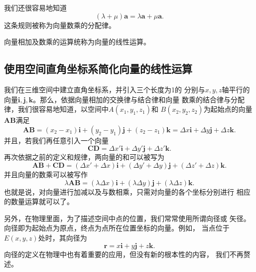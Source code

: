 我们还很容易地知道
\begin{equation}
    (\lambda+\mu)\boldsymbol{a}=\lambda\boldsymbol{a}+
    \mu\boldsymbol{a}.
\end{equation}
这条规则被称为向量数乘的分配律。

向量相加及数乘的运算统称为向量的线性运算。
\subsection{使用空间直角坐标系简化向量的线性运算}
我们在三维空间中建立直角坐标系，并引入三个长度为1的
分别与$x,y,z$轴平行的向量$\boldsymbol{i},\boldsymbol{j},
\boldsymbol{k}$。那么，依据向量相加的交换律与结合律和向量
数乘的结合律与分配律，我们很容易地知道，以空间中$A(x_1,y_1,z_1)$和
$B(x_2,y_2,z_2)$为起始点的向量$\boldsymbol{AB}$满足
\begin{equation}
    \boldsymbol{AB}=(x_2-x_1)\boldsymbol{i}+
    (y_2-y_1)\boldsymbol{j}+(z_2-z_1)\boldsymbol{k}
    =\Delta x\boldsymbol{i}+\Delta y\boldsymbol{j}
    +\Delta z\boldsymbol{k}.
\end{equation}
并且，若我们再任意引入一个向量
\begin{equation}
    \boldsymbol{CD}=\Delta x'\boldsymbol{i}
    +\Delta y'\boldsymbol{j}+\Delta z'\boldsymbol{k}.
\end{equation}
再次依据之前的定义和规律，两向量的和可以被写为
\begin{equation}
    \boldsymbol{AB}+\boldsymbol{CD}=(\Delta x'+\Delta x)\boldsymbol{i}
    +(\Delta y'+\Delta y)\boldsymbol{j}
    +(\Delta z'+\Delta z)\boldsymbol{k}.
\end{equation}
并且向量的数乘可以被写作
\begin{equation}
    \lambda \boldsymbol{AB}=(\lambda \Delta x)\boldsymbol{i}
    +(\lambda \Delta y)\boldsymbol{j}
    +(\lambda \Delta z)\boldsymbol{k}.
\end{equation}
也就是说，对向量进行加减以及与数相乘，只需对向量的各个坐标分别进行
相应的数量运算就可以了。

另外，在物理里面，为了描述空间中点的位置，我们常常使用所谓向径或
矢径。向径即为起始点为原点，终点为点所在位置坐标的向量。例如，
当点位于$E(x,y,z)$处时，其向径为
\begin{equation}
    \boldsymbol{r}=x\boldsymbol{i}+y\boldsymbol{j}
    +z\boldsymbol{k}.
\end{equation}
向径的定义在物理中也有着重要的应用，但没有新的根本性的内容，
我们不再赘述。

